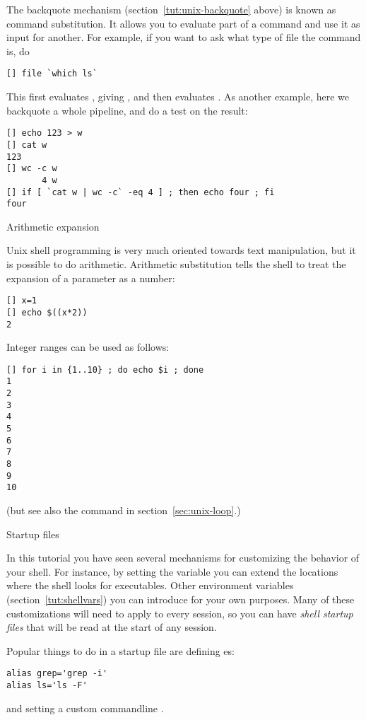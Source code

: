 The backquote mechanism (section~\ref{tut:unix-backquote} above)
is known as command substitution. It allows you to evaluate part
of a command and use it as input for another. For example,
if you want to ask what type of file the command  is, do
\begin{lstlisting}
[] file `which ls`
\end{lstlisting}
This first evaluates , giving , and then
evaluates . As another example, here
we backquote a whole pipeline, and do a test on the result:
\begin{lstlisting}
[] echo 123 > w
[] cat w
123
[] wc -c w
       4 w
[] if [ `cat w | wc -c` -eq 4 ] ; then echo four ; fi
four
\end{lstlisting}

 {Arithmetic expansion}
\label{sec:arith-expansion}

Unix shell programming is very much oriented towards text manipulation, but it 
is possible to do arithmetic. 
Arithmetic substitution tells the shell to treat the expansion of a
parameter as a number:
\begin{lstlisting}
[] x=1
[] echo $((x*2))
2
\end{lstlisting}

Integer ranges can be used as follows:
\begin{lstlisting}
[] for i in {1..10} ; do echo $i ; done
1
2
3
4
5
6
7
8
9
10
\end{lstlisting}
(but see also the  command in section~\ref{sec:unix-loop}.)

 {Startup files}

In this tutorial you have seen several mechanisms for customizing
the behavior of your shell. For instance, by setting the 
variable you can extend the locations where the shell looks for executables.
Other environment variables (section~\ref{tut:shellvars}) you can
introduce for your own purposes. Many of these customizations will
need to apply to every session, so you can have 
\emph{shell startup files} that will be read at the start of any session.

Popular things to do in a startup file are defining es:
\begin{lstlisting}
alias grep='grep -i'
alias ls='ls -F'
\end{lstlisting}
and setting a custom commandline .

